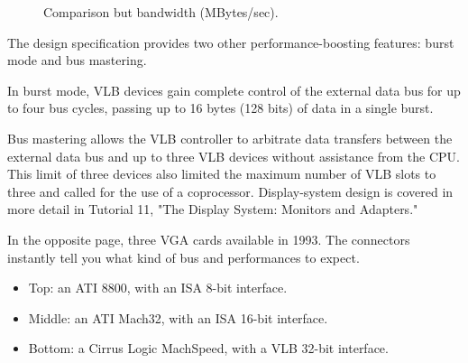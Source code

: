 \begin{figure}[H]
\centering
   \caption{Comparison but bandwidth (MBytes/sec).}
 \end{figure}
\par
The design specification provides two other performance-boosting features: burst mode and bus mastering.\\
\par In burst mode, VLB devices gain complete control of the external data bus for up to four bus cycles, passing up to 16 bytes (128 bits) of data in a single burst.\\
\par Bus mastering allows the VLB controller to arbitrate data transfers between the external data bus and up to three VLB devices without assistance from the CPU. This limit of three devices also limited the maximum number of VLB slots to three and called for the use of a coprocessor. Display-system design is covered in more detail in Tutorial 11, "The Display System: Monitors and Adapters."\\
\par
In the opposite page, three VGA cards available in 1993. The connectors instantly tell you what kind of bus and performances to expect.\\
\begin{itemize}
\item Top: an ATI 8800, with an ISA 8-bit interface.
\item Middle: an ATI Mach32, with an ISA 16-bit interface.
\item Bottom: a Cirrus Logic MachSpeed, with a VLB 32-bit interface.
\end{itemize}
 \pagebreak
{}\\
\par
{}\\
\par
{}\\


